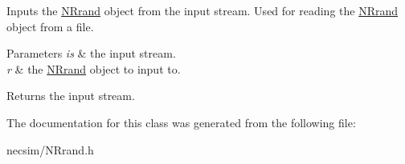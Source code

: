 Inputs the \hyperlink{class_n_rrand}{N\+Rrand} object from the input stream. Used for reading the \hyperlink{class_n_rrand}{N\+Rrand} object from a file. 


\begin{DoxyParams}{Parameters}
{\em is} & the input stream. \\
\hline
{\em r} & the \hyperlink{class_n_rrand}{N\+Rrand} object to input to. \\
\hline
\end{DoxyParams}
\begin{DoxyReturn}{Returns}
the input stream. 
\end{DoxyReturn}


The documentation for this class was generated from the following file\+:\begin{DoxyCompactItemize}
\item 
necsim/N\+Rrand.\+h\end{DoxyCompactItemize}
